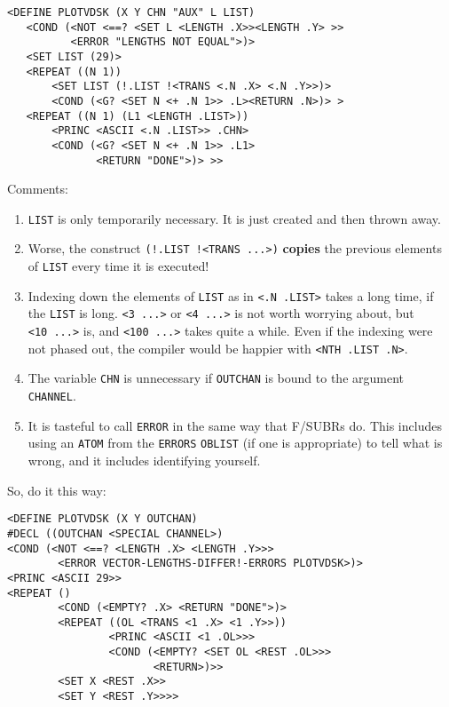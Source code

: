 \documentclass[a4paper]{scrbook}
\providecommand{\tightlist}{%
  \setlength{\itemsep}{0pt}\setlength{\parskip}{0pt}}
\begin{document}
\begin{verbatim}
<DEFINE PLOTVDSK (X Y CHN "AUX" L LIST)
   <COND (<NOT <==? <SET L <LENGTH .X>><LENGTH .Y> >>
          <ERROR "LENGTHS NOT EQUAL">)>
   <SET LIST (29)>
   <REPEAT ((N 1))
       <SET LIST (!.LIST !<TRANS <.N .X> <.N .Y>>)>
       <COND (<G? <SET N <+ .N 1>> .L><RETURN .N>)> >
   <REPEAT ((N 1) (L1 <LENGTH .LIST>))
       <PRINC <ASCII <.N .LIST>> .CHN>
       <COND (<G? <SET N <+ .N 1>> .L1>
              <RETURN "DONE">)> >>
\end{verbatim}

 

Comments:

\begin{enumerate}
\def\labelenumi{\arabic{enumi}.}
\tightlist
\item
  \texttt{LIST} is only temporarily necessary. It is just created and then thrown away.
\item
  Worse, the construct \texttt{(!.LIST\ !\textless{}TRANS\ ...\textgreater{})} \textbf{copies} the previous elements of
  \texttt{LIST} every time it is executed!
\item
  Indexing down the elements of \texttt{LIST} as in \texttt{\textless{}.N\ .LIST\textgreater{}} takes a long time, if the
  \texttt{LIST} is long. \texttt{\textless{}3\ ...\textgreater{}} or \texttt{\textless{}4\ ...\textgreater{}} is not worth
  worrying about, but \texttt{\textless{}10\ ...\textgreater{}} is, and \texttt{\textless{}100\ ...\textgreater{}} takes
  quite a while. Even if the indexing were not phased out, the compiler would be happier with
  \texttt{\textless{}NTH\ .LIST\ .N\textgreater{}}.
\item
  The variable \texttt{CHN} is unnecessary if \texttt{OUTCHAN} is bound to the argument \texttt{CHANNEL}.
\item
  It is tasteful to call \texttt{ERROR} in the same way that F/SUBRs do. This includes using an
  \texttt{ATOM} from the \texttt{ERRORS} \texttt{OBLIST} (if one is appropriate) to tell what is
  wrong, and it includes identifying yourself.
\end{enumerate}

So, do it this way:

\begin{verbatim}
<DEFINE PLOTVDSK (X Y OUTCHAN)
#DECL ((OUTCHAN <SPECIAL CHANNEL>)
<COND (<NOT <==? <LENGTH .X> <LENGTH .Y>>>
        <ERROR VECTOR-LENGTHS-DIFFER!-ERRORS PLOTVDSK>)>
<PRINC <ASCII 29>>
<REPEAT ()
        <COND (<EMPTY? .X> <RETURN "DONE">)>
        <REPEAT ((OL <TRANS <1 .X> <1 .Y>>))
                <PRINC <ASCII <1 .OL>>>
                <COND (<EMPTY? <SET OL <REST .OL>>>
                       <RETURN>)>>
        <SET X <REST .X>>
        <SET Y <REST .Y>>>>
\end{verbatim}
\end{document}
